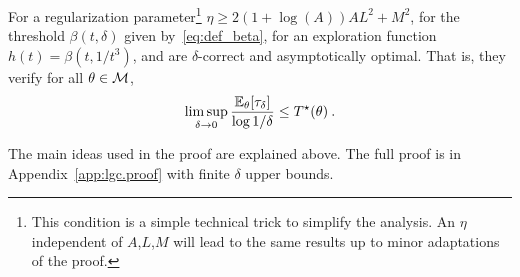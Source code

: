 \begin{theorem}\label{thm:sample_complexity}
For a regularization parameter\footnote{This condition is a simple technical trick to simplify the analysis. An $\eta$ independent of $A$,$L$,$M$ will lead to the same results up to minor adaptations of the proof.} $\eta \geq 2(1+\log(A))AL^2+M^2$, for the threshold $\beta(t,\delta)$ given by~\eqref{eq:def_beta}, for an exploration function $h(t)=\beta(t,1/t^3)$, \LG and \LGC are $\delta$-correct and asymptotically optimal. That is, they verify for all $\theta\in \mathcal{M}$,
\begin{align*}
\limsup_{\delta\to 0}\frac{\mathbb{E}_\theta[\tau_\delta]}{ \log 1/\delta} \le T^{\star}(\theta) \: .
\end{align*}
\end{theorem}
The main ideas used in the proof are explained above. The full proof is in Appendix~\ref{app:lgc.proof} with finite $\delta$ upper bounds.
